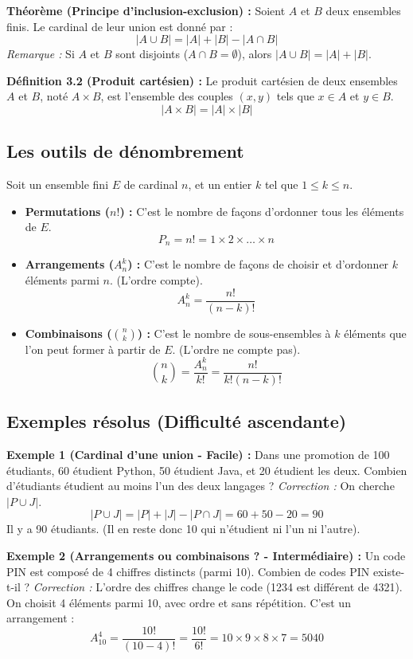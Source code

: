\documentclass[12pt,a4paper]{report}
\begin{document}
\textbf{Théorème (Principe d'inclusion-exclusion) :}
Soient $A$ et $B$ deux ensembles finis. Le cardinal de leur union est donné par :
$$ |A \cup B| = |A| + |B| - |A \cap B| $$
\textit{Remarque :} Si $A$ et $B$ sont disjoints ($A \cap B = \emptyset$), alors $|A \cup B| = |A| + |B|$.



\textbf{Définition 3.2 (Produit cartésien) :}
Le produit cartésien de deux ensembles $A$ et $B$, noté $A \times B$, est l'ensemble des couples $(x, y)$ tels que $x \in A$ et $y \in B$.
$$ |A \times B| = |A| \times |B| $$

\subsection{Les outils de dénombrement}
Soit un ensemble fini $E$ de cardinal $n$, et un entier $k$ tel que $1 \le k \le n$.

\begin{itemize}
    \item \textbf{Permutations ($n!$) :} C'est le nombre de façons d'ordonner tous les éléments de $E$.
    $$ P_n = n! = 1 \times 2 \times \dots \times n $$
    \item \textbf{Arrangements ($A_n^k$) :} C'est le nombre de façons de choisir et d'ordonner $k$ éléments parmi $n$. (L'ordre compte).
    $$ A_n^k = \frac{n!}{(n-k)!} $$
    \item \textbf{Combinaisons ($\binom{n}{k}$) :} C'est le nombre de sous-ensembles à $k$ éléments que l'on peut former à partir de $E$. (L'ordre ne compte pas).
    $$ \binom{n}{k} = \frac{A_n^k}{k!} = \frac{n!}{k!(n-k)!} $$
\end{itemize}

\subsection{Exemples résolus (Difficulté ascendante)}

\textbf{Exemple 1 (Cardinal d'une union - Facile) :} 
Dans une promotion de 100 étudiants, 60 étudient Python, 50 étudient Java, et 20 étudient les deux. Combien d'étudiants étudient au moins l'un des deux langages ?
\textit{Correction :} On cherche $|P \cup J|$.
$$ |P \cup J| = |P| + |J| - |P \cap J| = 60 + 50 - 20 = 90 $$
Il y a 90 étudiants. (Il en reste donc 10 qui n'étudient ni l'un ni l'autre).

\textbf{Exemple 2 (Arrangements ou combinaisons ? - Intermédiaire) :}
Un code PIN est composé de 4 chiffres distincts (parmi 10). Combien de codes PIN existe-t-il ?
\textit{Correction :} L'ordre des chiffres change le code (1234 est différent de 4321). On choisit 4 éléments parmi 10, avec ordre et sans répétition. C'est un arrangement :
$$ A_{10}^4 = \frac{10!}{(10-4)!} = \frac{10!}{6!} = 10 \times 9 \times 8 \times 7 = 5040 $$
\end{document}
